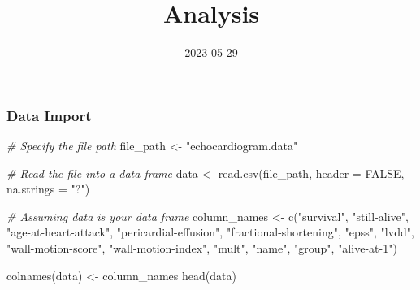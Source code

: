 \documentclass[
]{article}
\title{Analysis}
\author{}
\date{\vspace{-2.5em}2023-05-29}
\newenvironment{Shaded}{\begin{snugshade}}{\end{snugshade}}
\newcommand{\AttributeTok}[1]{\textcolor[rgb]{0.77,0.63,0.00}{#1}}
\newcommand{\CommentTok}[1]{\textcolor[rgb]{0.56,0.35,0.01}{\textit{#1}}}
\newcommand{\ConstantTok}[1]{\textcolor[rgb]{0.00,0.00,0.00}{#1}}
\newcommand{\FunctionTok}[1]{\textcolor[rgb]{0.00,0.00,0.00}{#1}}
\newcommand{\NormalTok}[1]{#1}
\newcommand{\OtherTok}[1]{\textcolor[rgb]{0.56,0.35,0.01}{#1}}
\newcommand{\StringTok}[1]{\textcolor[rgb]{0.31,0.60,0.02}{#1}}
\begin{document}
\maketitle

\hypertarget{data-import}{%
\subsubsection{Data Import}\label{data-import}}

\begin{Shaded}
\begin{Highlighting}[]
\CommentTok{\# Specify the file path}
\NormalTok{file\_path }\OtherTok{\textless{}{-}} \StringTok{"echocardiogram.data"}

\CommentTok{\# Read the file into a data frame}
\NormalTok{data }\OtherTok{\textless{}{-}} \FunctionTok{read.csv}\NormalTok{(file\_path, }\AttributeTok{header =} \ConstantTok{FALSE}\NormalTok{, }\AttributeTok{na.strings =} \StringTok{"?"}\NormalTok{)}

\CommentTok{\# Assuming \textasciigrave{}data\textasciigrave{} is your data frame}
\NormalTok{column\_names }\OtherTok{\textless{}{-}} \FunctionTok{c}\NormalTok{(}\StringTok{"survival"}\NormalTok{, }\StringTok{"still{-}alive"}\NormalTok{, }\StringTok{"age{-}at{-}heart{-}attack"}\NormalTok{, }\StringTok{"pericardial{-}effusion"}\NormalTok{, }\StringTok{"fractional{-}shortening"}\NormalTok{, }\StringTok{"epss"}\NormalTok{, }\StringTok{"lvdd"}\NormalTok{, }\StringTok{"wall{-}motion{-}score"}\NormalTok{, }\StringTok{"wall{-}motion{-}index"}\NormalTok{, }\StringTok{"mult"}\NormalTok{, }\StringTok{"name"}\NormalTok{, }\StringTok{"group"}\NormalTok{, }\StringTok{"alive{-}at{-}1"}\NormalTok{)}

\FunctionTok{colnames}\NormalTok{(data) }\OtherTok{\textless{}{-}}\NormalTok{ column\_names}
\FunctionTok{head}\NormalTok{(data)}
\end{Highlighting}
\end{Shaded}
\end{document}
